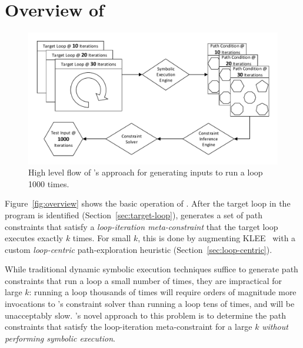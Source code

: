 \section{Overview of \lancet}\label{sec:overview}



\begin{figure}[tb]
\centering
\includegraphics[width=\linewidth]{figures/method}
\caption{High level flow of \lancet's approach for generating inputs to run a loop 1000 times.}
\label{fig:method}
\end{figure}

Figure~\ref{fig:overview} shows the basic operation of \lancet. After the target loop in the program is identified (Section~\ref{sec:target-loop}), \lancet generates a set of path constraints that satisfy a {\em loop-iteration meta-constraint} that the target loop executes exactly $k$ times. For small $k$, this is done by augmenting KLEE~\cite{klee} with a custom {\em loop-centric} path-exploration heuristic (Section~\ref{sec:loop-centric}). 

While traditional dynamic symbolic execution techniques suffice to generate path constraints that run a loop a small number of times, they are impractical for large $k$: running a loop thousands of times will require orders of magnitude more invocations to \lancet's constraint solver than running a loop tens of times, and will be unacceptably slow. \lancet's novel approach to this problem is to determine the path constraints that satisfy the loop-iteration meta-constraint for a large $k$ {\em without performing symbolic execution}.

